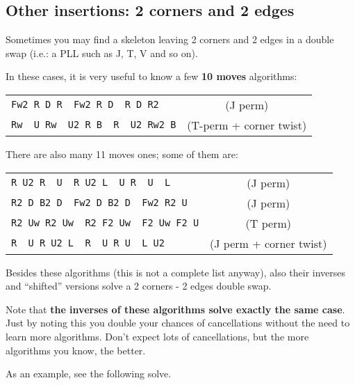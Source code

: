 \documentclass[11pt,a4paper]{book}
\newcommand{\p}{\textquotesingle}
\newcommand{\m}{\texttt}
\newcommand{\ps}{\p\,\,}
\begin{document}
\subsection{Other insertions: 2 corners and 2 edges}

Sometimes you may find a skeleton leaving 2 corners and 2 edges in a double swap (i.e.: a PLL such as J, T, V and so on).

In these cases, it is very useful to know a few \textbf{10 moves} algorithms:
\begin{center}
\begin{tabular}{lc}
\m{Fw2 R D R\ps Fw2 R D\ps R D R2} & (J perm)\\
\m{Rw\ps U Rw\ps U2 R B\ps R\ps U2 Rw2 B\p} & (T-perm + corner twist)
\end{tabular}
\end{center}
There are also many 11 moves ones; some of them are:
\begin{center}
\begin{tabular}{lc}
\m{R U2 R\ps U\ps R U2 L\ps U R\ps U\ps L} & (J perm)\\
\m{R2 D B2 D\ps Fw2 D B2 D\ps Fw2 R2 U\p} & (J perm)\\
\m{R2 Uw R2 Uw\ps R2 F2 Uw\ps F2 Uw F2 U\p} & (T perm)\\
\m{R\ps U R U2 L\ps R\ps U R U\ps L U2} & (J perm + corner twist)
\end{tabular}
\end{center}
Besides these algorithms (this is not a complete list anyway), also their inverses and ``shifted'' versions solve a 2 corners - 2 edges double swap.

Note that \textbf{the inverses of these algorithms solve exactly the same case}. Just by noting this you double your chances of cancellations without the need to learn more algorithms.
Don't expect lots of cancellations, but the more algorithms you know, the better.

As an example, see the following solve.
\end{document}
